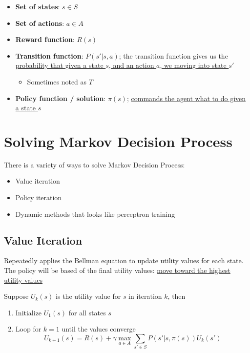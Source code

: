   \begin{itemize}
    \item \textbf{Set of states}: $ s \in S $
    \item \textbf{Set of actions}: $ a \in A $
    \item \textbf{Reward function}: $ R\left( s \right) $
    \item \textbf{Transition function}: $ P\left( s' | s, a \right) $;
    the transition function gives us the \ul{probability that
    given a state $ s $, and an action $ a $, we moving into state $ s' $}
    \begin{itemize}
      \item Sometimes noted as $ T $
    \end{itemize}

    \item \textbf{Policy function / solution}: $ \pi\left( s \right) $;
    \ul{commands the agent what to do given a state $ s $}
  \end{itemize}

\section{Solving Markov Decision Process}

  There is a variety of ways to solve Markov Decision Process:

  \begin{itemize}
    \item Value iteration
    \item Policy iteration
    \item Dynamic methods that looks like perceptron training
  \end{itemize}

  \subsection{Value Iteration}

    Repeatedly applies the Bellman equation to update utility values for
    each state. The policy will be based of the final utility values:
    \ul{move toward the highest utility values}

    Suppose $ U_{k}\left( s \right) $ is the utility value
    for $ s $ in iteration $ k $, then

    \begin{enumerate}
      \item Initialize $ U_{1}\left( s \right) $ for all states $ s $
      \item Loop for $ k = 1 $ until the values converge
      \begin{equation}
        U_{k + 1}\left( s \right)
          = R\left( s \right)
          + \gamma \max_{a \in A} \sum_{s' \in S}
          P\left( s' | s, \pi\left( s \right) \right)
          U_{k}\left( s' \right)
      \end{equation}
    \end{enumerate}

